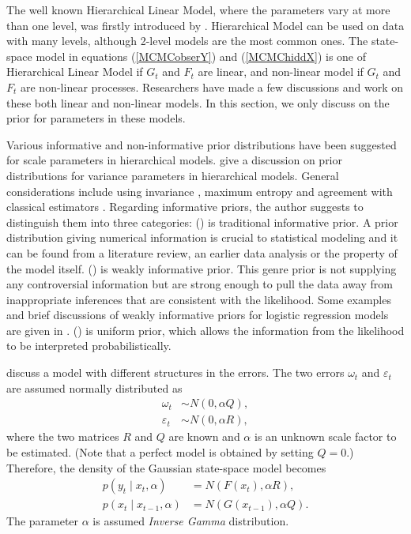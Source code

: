 The well known Hierarchical Linear Model, where the parameters vary at more than one level, was firstly introduced by \cite{lindley1972bayes, smith1973general}. Hierarchical Model can be used on data with many levels, although 2-level models are the most common ones. The state-space model in equations (\ref{MCMCobserY}) and (\ref{MCMChiddX}) is one of Hierarchical Linear Model if $G_t$ and $F_t$ are linear, and non-linear model if $G_t$ and $F_t$ are non-linear processes. Researchers have made a few discussions and work on these both linear and non-linear models. In this section, we only discuss on the prior for parameters in these models. 

Various informative and non-informative prior distributions have been suggested for scale parameters in hierarchical models. \cite{gelman2006prior} give a discussion on prior distributions for variance parameters in hierarchical models. General considerations include using invariance \citep{jeffries1961theory}, maximum entropy \citep{jaynes1983papers} and agreement with classical estimators \citep{box2011bayesian}. Regarding informative priors, the author suggests to distinguish them into three categories: () is traditional informative prior. A prior distribution giving numerical information is crucial to statistical modeling and it can be found from a literature review, an earlier data analysis or the property of the model itself. () is weakly informative prior. This genre prior is not supplying any controversial information but are strong enough to pull the data away from inappropriate inferences that are consistent with the likelihood. Some examples and brief discussions of weakly informative priors for logistic regression models are given in \citep{gelman2008weakly}. () is uniform prior, which allows the information from the likelihood to be interpreted probabilistically. 

\cite{stroud2007sequential} discuss a model with different structures in the errors. The two errors $\omega_t$ and $\varepsilon_t$ are assumed normally distributed as
\begin{align*}
\omega_t &\sim N(0,\alpha Q),\\
\varepsilon_t &\sim N(0,\alpha R),
\end{align*}
where the two matrices $R$ and $Q$ are known and $\alpha$ is an unknown scale factor to be estimated. (Note that a perfect model is obtained by setting $Q= 0$.) Therefore, the density of the Gaussian state-space model becomes 
\begin{align*}
p(y_t\mid x_t,\alpha) &= N(F(x_t),\alpha R),\\
p(x_t\mid x_{t-1},\alpha) &= N(G(x_{t-1}),\alpha Q).
\end{align*}
The parameter $\alpha$ is assumed \textit{Inverse Gamma} distribution. 

